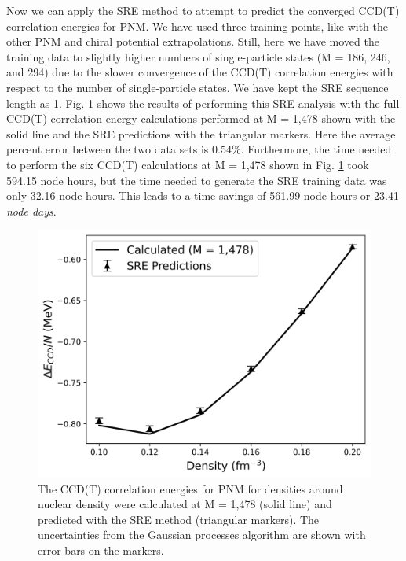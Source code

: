 Now we can apply the SRE method to attempt to predict the converged CCD(T) correlation energies for PNM.  We have used three training points, like with the other PNM and chiral potential extrapolations. Still, here we have moved the training data to slightly higher numbers of single-particle states (M = 186, 246, and 294) due to the slower convergence of the CCD(T) correlation energies with respect to the number of single-particle states.  We have kept the SRE sequence length as 1.  Fig. \ref{fig:sre_pnm_ccdt_pert} shows the results of performing this SRE analysis with the full CCD(T) correlation energy calculations performed at M = 1,478 shown with the solid line and the SRE predictions with the triangular markers.  Here the average percent error between the two data sets is 0.54$\%$.  Furthermore, the time needed to perform the six CCD(T) calculations at M = 1,478 shown in Fig. \ref{fig:sre_pnm_ccdt_pert} took 594.15 node hours, but the time needed to generate the SRE training data was only 32.16 node hours.  This leads to a time savings of 561.99 node hours or 23.41 \textit{node days}.

\begin{figure}
    \centering
    \includegraphics{Images/Chapter8/FinalReport4a.png}
    \caption{The CCD(T) correlation energies for PNM for densities around nuclear density were calculated at M = 1,478 (solid line) and predicted with the SRE method (triangular markers).  The uncertainties from the Gaussian processes algorithm are shown with error bars on the markers.}
    \label{fig:sre_pnm_ccdt_pert}
\end{figure}


